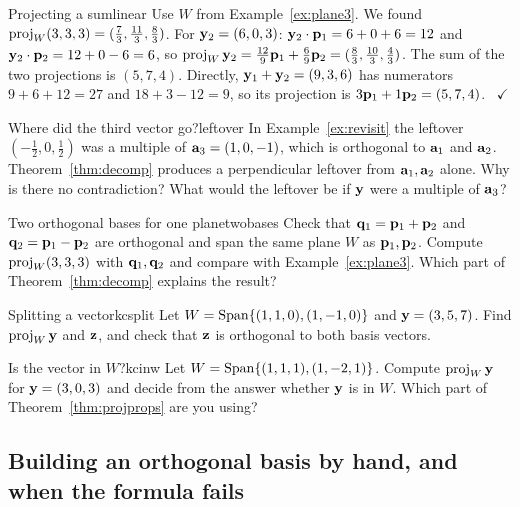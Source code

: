 \documentclass[11pt]{article}
\begin{document}
\begin{exmp}{Projecting a sum}{linear}
Use $W$ from Example~\ref{ex:plane3}. We found $\operatorname{proj}_W(3,3,3)=(\tfrac73,\tfrac{11}3,\tfrac83)$. For $\mathbf{y}_2=(6,0,3)$: $\mathbf{y}_2\cdot\mathbf{p}_1=6+0+6=12$ and $\mathbf{y}_2\cdot\mathbf{p}_2=12+0-6=6$, so $\operatorname{proj}_W\mathbf{y}_2=\tfrac{12}9\mathbf{p}_1+\tfrac69\mathbf{p}_2=(\tfrac83,\tfrac{10}3,\tfrac43)$. The sum of the two projections is $(5,7,4)$. Directly, $\mathbf{y}_1+\mathbf{y}_2=(9,3,6)$ has numerators $9+6+12=27$ and $18+3-12=9$, so its projection is $3\mathbf{p}_1+1\mathbf{p}_2=(5,7,4)$. \ $\checkmark$
\end{exmp}

\begin{think}{Where did the third vector go?}{leftover}
In Example~\ref{ex:revisit} the leftover $(-\tfrac12,0,\tfrac12)$ was a multiple of $\mathbf{a}_3=(1,0,-1)$, which is orthogonal to $\mathbf{a}_1$ and $\mathbf{a}_2$. Theorem~\ref{thm:decomp} produces a perpendicular leftover from $\mathbf{a}_1,\mathbf{a}_2$ alone. Why is there no contradiction? What would the leftover be if $\mathbf{y}$ were a multiple of $\mathbf{a}_3$?
\end{think}

\begin{think}{Two orthogonal bases for one plane}{twobases}
Check that $\mathbf{q}_1=\mathbf{p}_1+\mathbf{p}_2$ and $\mathbf{q}_2=\mathbf{p}_1-\mathbf{p}_2$ are orthogonal and span the same plane $W$ as $\mathbf{p}_1,\mathbf{p}_2$. Compute $\operatorname{proj}_W(3,3,3)$ with $\mathbf{q}_1,\mathbf{q}_2$ and compare with Example~\ref{ex:plane3}. Which part of Theorem~\ref{thm:decomp} explains the result?
\end{think}

\begin{kc}{Splitting a vector}{kcsplit}
Let $W=\operatorname{Span}\{(1,1,0),(1,-1,0)\}$ and $\mathbf{y}=(3,5,7)$. Find $\operatorname{proj}_W\mathbf{y}$ and $\mathbf{z}$, and check that $\mathbf{z}$ is orthogonal to both basis vectors.
\end{kc}

\begin{kc}{Is the vector in $W$?}{kcinw}
Let $W=\operatorname{Span}\{(1,1,1),(1,-2,1)\}$. Compute $\operatorname{proj}_W\mathbf{y}$ for $\mathbf{y}=(3,0,3)$ and decide from the answer whether $\mathbf{y}$ is in $W$. Which part of Theorem~\ref{thm:projprops} are you using?
\end{kc}

\subsection*{Building an orthogonal basis by hand, and when the formula fails}
\end{document}
